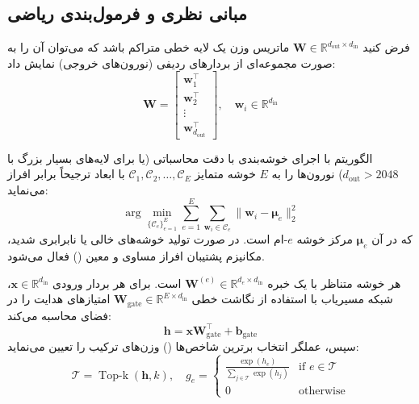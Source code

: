 \subsection{مبانی نظری و فرمول‌بندی ریاضی}
فرض کنید $\mathbf{W} \in \mathbb{R}^{d_{\text{out}} \times d_{\text{in}}}$ ماتریس وزن یک لایه خطی متراکم باشد که می‌توان آن را به صورت مجموعه‌ای از بردارهای ردیفی (نورون‌های خروجی) نمایش داد:
\begin{equation}
\mathbf{W} = \begin{bmatrix} \mathbf{w}_1^\top \\ \mathbf{w}_2^\top \\ \vdots \\ \mathbf{w}_{d_{\text{out}}}^\top \end{bmatrix}, \quad \mathbf{w}_i \in \mathbb{R}^{d_{\text{in}}}
\end{equation}

الگوریتم  با اجرای خوشه‌بندی  با دقت محاسباتی  (یا  برای لایه‌های بسیار بزرگ با $d_{\text{out}} > 2048$) نورون‌ها را به $E$ خوشه متمایز $\mathcal{C}_1, \mathcal{C}_2, \dots, \mathcal{C}_E$ با ابعاد ترجیحاً برابر افراز می‌نماید:
\begin{equation}
\arg\min_{\{\mathcal{C}_e\}_{e=1}^E} \sum_{e=1}^E \sum_{\mathbf{w}_i \in \mathcal{C}_e} \|\mathbf{w}_i - \boldsymbol{\mu}_e\|_2^2
\end{equation}
که در آن $\boldsymbol{\mu}_e$ مرکز خوشه $e$-ام است. در صورت تولید خوشه‌های خالی یا نابرابری شدید، مکانیزم پشتیبان افراز مساوی و معین () فعال می‌شود.

هر خوشه متناظر با یک خبره $\mathbf{W}^{(e)} \in \mathbb{R}^{d_e \times d_{\text{in}}}$ است. برای هر بردار ورودی $\mathbf{x} \in \mathbb{R}^{d_{\text{in}}}$، شبکه مسیریاب با استفاده از نگاشت خطی $\mathbf{W}_{\text{gate}} \in \mathbb{R}^{E \times d_{\text{in}}}$ امتیازهای هدایت را در فضای  محاسبه می‌کند:
\begin{equation}
\mathbf{h} = \mathbf{x} \mathbf{W}_{\text{gate}}^\top + \mathbf{b}_{\text{gate}}
\end{equation}
سپس، عملگر انتخاب برترین شاخص‌ها () وزن‌های ترکیب را تعیین می‌نماید:
\begin{equation}
\mathcal{T} = \operatorname{Top-k}(\mathbf{h}, k), \quad g_e = \begin{cases} \frac{\exp(h_e)}{\sum_{j \in \mathcal{T}} \exp(h_j)} & \text{if } e \in \mathcal{T} \\ 0 & \text{otherwise} \end{cases}
\end{equation}


